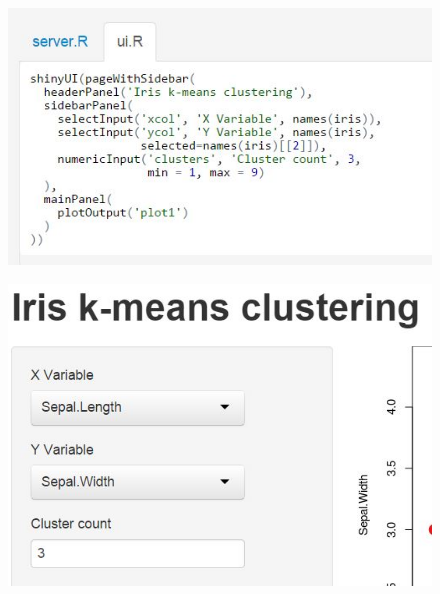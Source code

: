 \documentclass{beamer}
\begin{document}
\begin{frame}
	\begin{figure}
\centering
\includegraphics[width=0.9\linewidth]{00-ui}

\end{figure}

\end{frame}
\begin{frame}
	\begin{figure}
		\centering
		\includegraphics[width=0.9\linewidth]{00-sidebar}
		
	\end{figure}
	
\end{frame}
\end{document}
